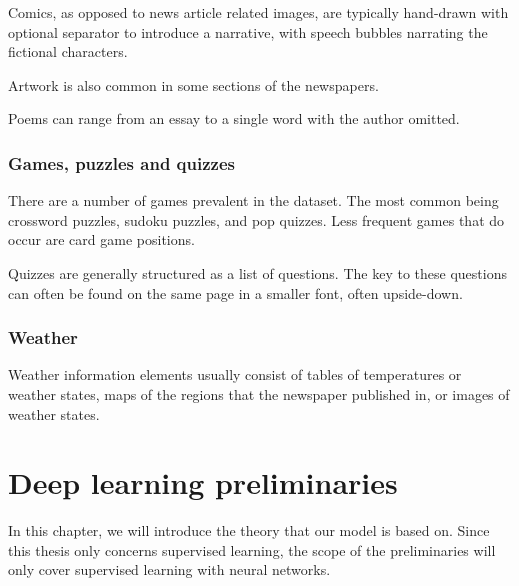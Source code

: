 \documentclass[oneside, english, bibtex]{kththesis}
\begin{document}
Comics, as opposed to news article related images, are typically hand-drawn with optional separator to introduce a narrative, with speech bubbles narrating the fictional characters.

Artwork is also common in some sections of the newspapers.

Poems can range from an essay to a single word with the author omitted.

\subsubsection{Games, puzzles and quizzes}

There are a number of games prevalent in the dataset. The most common being crossword puzzles, sudoku puzzles, and pop quizzes. Less frequent games that do occur are card game positions.

Quizzes are generally structured as a list of questions. The key to these questions can often be found on the same page in a smaller font, often upside-down.

\subsubsection{Weather}

Weather information elements usually consist of tables of temperatures or weather states, maps of the regions that the newspaper published in, or images of weather states.

\section{Deep learning preliminaries}
\label{sec:preliminaries}

In this chapter, we will introduce the theory that our model is based on. Since this thesis only concerns supervised learning, the scope of the preliminaries will only cover supervised learning with neural networks.


\end{document}
